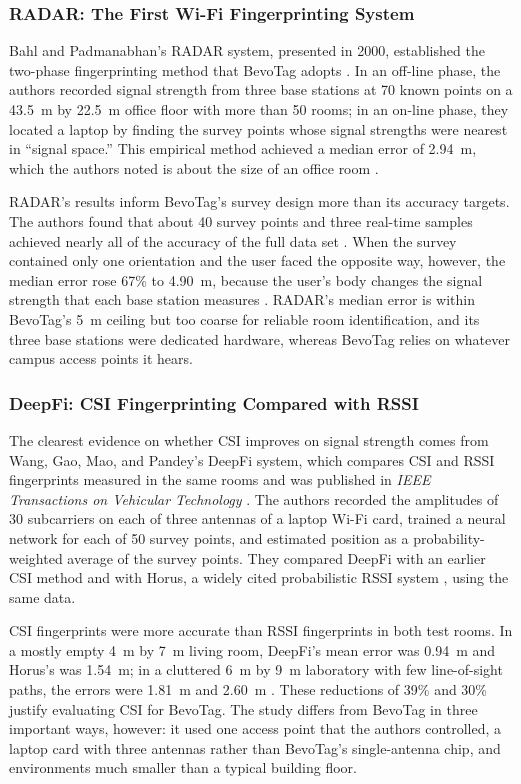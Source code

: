 \documentclass[12pt,letterpaper]{article}
\begin{document}
\subsubsection{RADAR: The First Wi-Fi Fingerprinting System}
Bahl and Padmanabhan's RADAR system, presented in 2000, established the two-phase fingerprinting
method that BevoTag adopts \cite{radar}. In an off-line phase, the authors recorded signal strength
from three base stations at 70 known points on a 43.5~m by 22.5~m office floor with more than 50
rooms; in an on-line phase, they located a laptop by finding the survey points whose signal
strengths were nearest in ``signal space.'' This empirical method achieved a median error of
2.94~m, which the authors noted is about the size of an office room \cite{radar}.

RADAR's results inform BevoTag's survey design more than its accuracy targets. The authors found
that about 40 survey points and three real-time samples achieved nearly all of the accuracy of the
full data set \cite{radar}. When the survey contained only one orientation and the user faced the
opposite way, however, the median error rose 67\% to 4.90~m, because the user's body changes the
signal strength that each base station measures \cite{radar}. RADAR's median error is within
BevoTag's 5~m ceiling but too coarse for reliable room identification, and its three base stations
were dedicated hardware, whereas BevoTag relies on whatever campus access points it hears.

\subsubsection{DeepFi: CSI Fingerprinting Compared with RSSI}
The clearest evidence on whether CSI improves on signal strength comes from Wang, Gao, Mao, and
Pandey's DeepFi system, which compares CSI and RSSI fingerprints measured in the same rooms and was
published in \emph{IEEE Transactions on Vehicular Technology} \cite{deepfi}. The authors recorded
the amplitudes of 30 subcarriers on each of three antennas of a laptop Wi-Fi card, trained a neural
network for each of 50 survey points, and estimated position as a probability-weighted average of
the survey points. They compared DeepFi with an earlier CSI method and with Horus, a widely cited
probabilistic RSSI system \cite{horus}, using the same data.

CSI fingerprints were more accurate than RSSI fingerprints in both test rooms. In a mostly empty
4~m by 7~m living room, DeepFi's mean error was 0.94~m and Horus's was 1.54~m; in a cluttered 6~m
by 9~m laboratory with few line-of-sight paths, the errors were 1.81~m and 2.60~m
\cite{deepfi}. These reductions of 39\% and 30\% justify evaluating CSI for BevoTag. The study
differs from BevoTag in three important ways, however: it used one access point that the authors
controlled, a laptop card with three antennas rather than BevoTag's single-antenna chip, and environments
much smaller than a typical building floor.
\end{document}
